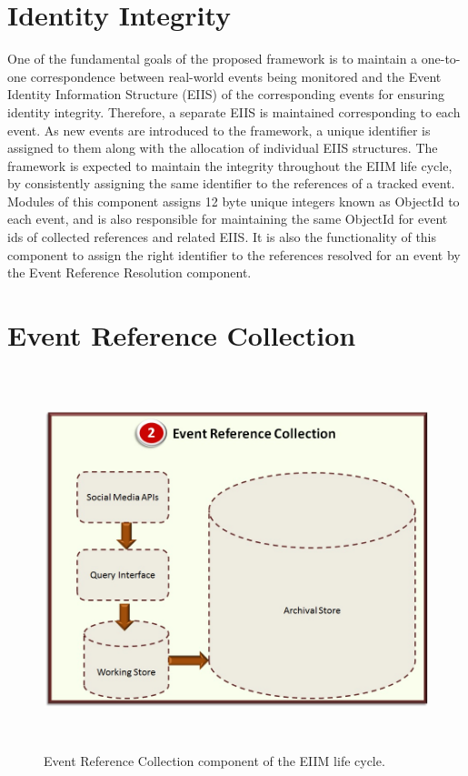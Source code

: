 \section{Identity Integrity}
One of the fundamental goals of the proposed framework is to maintain a one-to-one correspondence between real-world events being monitored and the Event Identity Information Structure (EIIS) of the corresponding events for ensuring identity integrity. Therefore, a separate EIIS is maintained corresponding to each event. As new events are introduced to the framework, a unique identifier is assigned to them along with the allocation of individual EIIS structures. The framework is expected to maintain the integrity throughout the EIIM life cycle, by consistently assigning the same identifier to the references of a tracked event. Modules of this component assigns 12 byte unique integers known as ObjectId  to each event, and is also responsible for maintaining the same ObjectId for event ids of collected references and related EIIS. It is also the functionality of this component to assign the right identifier to the references resolved for an event by the Event Reference Resolution component.


\section{Event Reference Collection}

\begin{figure}[htbp]
  \caption{Event Reference Collection component of the EIIM life cycle.}
  \centering
    \includegraphics[width=14cm,height=11cm]{Figures/EIIMComponents/EventReferenceCollection.jpg}
\end{figure}

